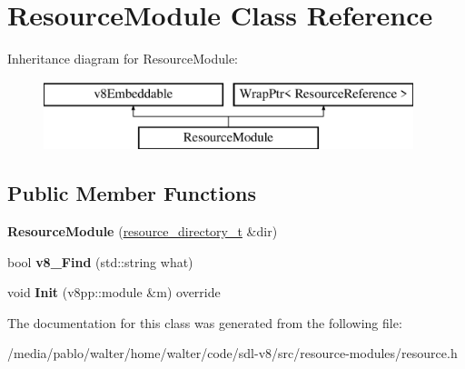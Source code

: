 \hypertarget{classResourceModule}{}\section{Resource\+Module Class Reference}
\label{classResourceModule}
Inheritance diagram for Resource\+Module\+:\begin{figure}[H]
\begin{center}
\leavevmode
\includegraphics[height=2.000000cm]{classResourceModule}
\end{center}
\end{figure}
\subsection*{Public Member Functions}
\begin{DoxyCompactItemize}
\item 
\mbox{\label{classResourceModule_a94658f82db53b26a96d7cdfc21ab2a6e}} 
{\bfseries Resource\+Module} (\mbox{\hyperlink{classWrapPtr}{resource\+\_\+directory\+\_\+t}} \&dir)
\item 
\mbox{\label{classResourceModule_a5b08966beb88fa1daa89ac3da390cb00}} 
bool {\bfseries v8\+\_\+\+Find} (std\+::string what)
\item 
\mbox{\label{classResourceModule_a579187b068a524ec81d19dd4ea8b1d5a}} 
void {\bfseries Init} (v8pp\+::module \&m) override
\end{DoxyCompactItemize}


The documentation for this class was generated from the following file\+:\begin{DoxyCompactItemize}
\item 
/media/pablo/walter/home/walter/code/sdl-\/v8/src/resource-\/modules/resource.\+h\end{DoxyCompactItemize}
